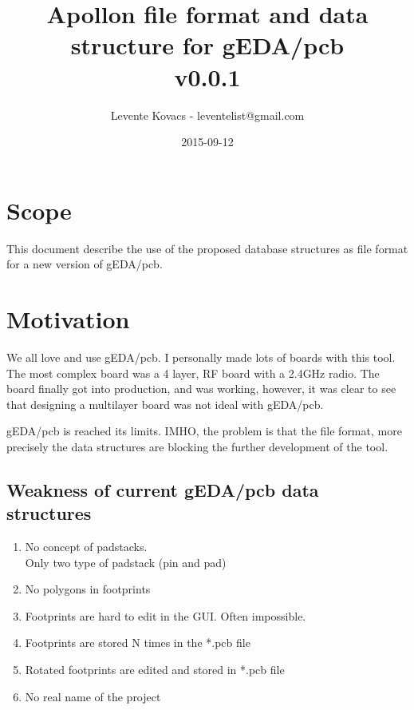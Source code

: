 \documentclass[12pt]{article}
\begin{document}
\title{Apollon file format and data structure for gEDA/pcb\\v0.0.1}
\date{2015-09-12}
\author{Levente Kovacs - leventelist@gmail.com}

\maketitle
\tableofcontents

\section{Scope}\label{scope}

This document describe the use of the proposed database structures as
file format for a new version of gEDA/pcb.

\section{Motivation}\label{motivation}

We all love and use gEDA/pcb. I personally made lots of boards with this tool.
The most complex board was a 4 layer, RF board with a 2.4GHz radio. The
board finally got into production, and was working, however, it was
clear to see that designing a multilayer board was not ideal with gEDA/pcb.

gEDA/pcb is reached its limits. IMHO, the problem is that the file format,
more precisely the data structures are blocking the further development of
the tool.

\subsection{Weakness of current gEDA/pcb data
structures}\label{weakness-of-current-gedapcb-data-structures}

\begin{enumerate}
\item
  No concept of padstacks.\\ Only two type of padstack (pin and pad)
\item
  No polygons in footprints
\item
  Footprints are hard to edit in the GUI. Often impossible.
\item
  Footprints are stored N times in the *.pcb file
\item
  Rotated footprints are edited and stored in *.pcb file
\item
  No real name of the project
\end{enumerate}
\end{document}
